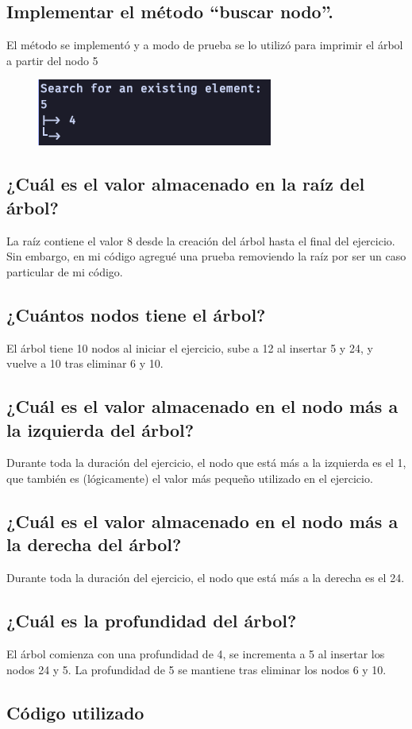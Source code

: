 \documentclass[a4paper,notitlepage]{article}
\begin{document}
\subsection{Implementar el método “buscar nodo”.}

El método se implementó y a modo de prueba se lo utilizó para imprimir el árbol
a partir del nodo 5

\begin{figure}[H]
    \centering
    \includegraphics[scale=0.65]{imgs/search.png}
\end{figure}

\subsection{¿Cuál es el valor almacenado en la raíz del árbol?}
La raíz contiene el valor 8 desde la creación del árbol hasta el final del
ejercicio. Sin embargo, en mi código agregué una prueba removiendo la raíz
por ser un caso particular de mi código.

\subsection{¿Cuántos nodos tiene el árbol?}
El árbol tiene 10 nodos al iniciar el ejercicio, sube a 12 al insertar 5 y 24,
y vuelve a 10 tras eliminar 6 y 10.

\subsection{¿Cuál es el valor almacenado en el nodo más a la izquierda del árbol?}
Durante toda la duración del ejercicio, el nodo que está más a la izquierda es
el 1, que también es (lógicamente) el valor más pequeño utilizado en el
ejercicio.

\subsection{¿Cuál es el valor almacenado en el nodo más a la derecha del árbol?}
Durante toda la duración del ejercicio, el nodo que está más a la derecha es
el 24.

\subsection{¿Cuál es la profundidad del árbol?}
El árbol comienza con una profundidad de 4, se incrementa a 5 al insertar los
nodos 24 y 5. La profundidad de 5 se mantiene tras eliminar los nodos 6 y 10.

\begin{appendix}
    \section{Código utilizado}
    
\end{appendix}
\end{document}
